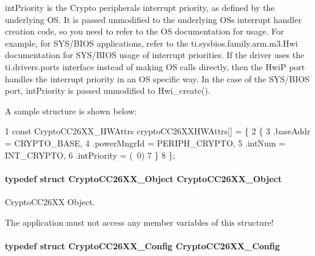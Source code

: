int\+Priority is the Crypto peripheral\textquotesingle{}s interrupt priority, as defined by the underlying O\+S. It is passed unmodified to the underlying O\+S\textquotesingle{}s interrupt handler creation code, so you need to refer to the O\+S documentation for usage. For example, for S\+Y\+S/\+B\+I\+O\+S applications, refer to the ti.\+sysbios.\+family.\+arm.\+m3.\+Hwi documentation for S\+Y\+S/\+B\+I\+O\+S usage of interrupt priorities. If the driver uses the ti.\+drivers.\+ports interface instead of making O\+S calls directly, then the Hwi\+P port handles the interrupt priority in an O\+S specific way. In the case of the S\+Y\+S/\+B\+I\+O\+S port, int\+Priority is passed unmodified to Hwi\+\_\+create().

A sample structure is shown below\+: 
\begin{DoxyCode}
1 const CryptoCC26XX\_HWAttrs cryptoCC26XXHWAttrs[] = \{
2     \{
3         .baseAddr = CRYPTO\_BASE,
4         .powerMngrId = PERIPH\_CRYPTO,
5         .intNum = INT\_CRYPTO,
6         .intPriority = (~0)
7     \}
8 \};
\end{DoxyCode}
\paragraph[{Crypto\+C\+C26\+X\+X\+\_\+\+Object}]{\setlength{\rightskip}{0pt plus 5cm}typedef struct {\bf Crypto\+C\+C26\+X\+X\+\_\+\+Object}  {\bf Crypto\+C\+C26\+X\+X\+\_\+\+Object}}\label{_crypto_c_c26_x_x_8h_a1d3ce506f41ca09dbb4fc02615c54d4e}


Crypto\+C\+C26\+X\+X Object. 

The application must not access any member variables of this structure! 
\paragraph[{Crypto\+C\+C26\+X\+X\+\_\+\+Config}]{\setlength{\rightskip}{0pt plus 5cm}typedef struct {\bf Crypto\+C\+C26\+X\+X\+\_\+\+Config}  {\bf Crypto\+C\+C26\+X\+X\+\_\+\+Config}}\label{_crypto_c_c26_x_x_8h_a7ff3fbcb90bc60cea7c5a281d5c7add2}


